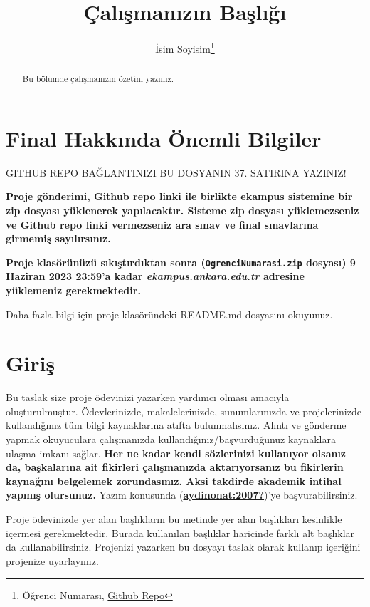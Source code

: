 \documentclass[
  12pt,
]{article}
\title{Çalışmanızın Başlığı}
\author{İsim Soyisim\footnote{Öğrenci Numarası, \href{https://github.com/KULLANICI_ADINIZ/REPO_ADINIZ}{Github Repo}}}
\date{}
\begin{document}
\maketitle
\begin{abstract}
Bu bölümde çalışmanızın özetini yazınız.
\end{abstract}

\hypertarget{final-hakkux131nda-uxf6nemli-bilgiler}{%
\section{Final Hakkında Önemli Bilgiler}\label{final-hakkux131nda-uxf6nemli-bilgiler}}

\colorbox{BurntOrange}{GITHUB REPO BAĞLANTINIZI BU DOSYANIN 37. SATIRINA YAZINIZ!}

\textbf{Proje gönderimi, Github repo linki ile birlikte ekampus sistemine bir zip dosyası yüklenerek yapılacaktır. Sisteme zip dosyası yüklemezseniz ve Github repo linki vermezseniz ara sınav ve final sınavlarına girmemiş sayılırsınız.}

\textbf{Proje klasörünüzü sıkıştırdıktan sonra (\texttt{OgrenciNumarasi.zip} dosyası) 9 Haziran 2023 23:59'a kadar \emph{ekampus.ankara.edu.tr} adresine yüklemeniz gerekmektedir.}

\colorbox{WildStrawberry}{Daha fazla bilgi için proje klasöründeki README.md dosyasını okuyunuz.}

\hypertarget{giriux15f}{%
\section{Giriş}\label{giriux15f}}

Bu taslak size proje ödevinizi yazarken yardımcı olması amacıyla oluşturulmuştur. Ödevlerinizde, makalelerinizde, sunumlarınızda ve projelerinizde kullandığınız tüm bilgi kaynaklarına atıfta bulunmalısınız. Alıntı ve gönderme yapmak okuyuculara çalışmanızda kullandığınız/başvurduğunuz kaynaklara ulaşma imkanı sağlar. \textbf{Her ne kadar kendi sözlerinizi kullanıyor olsanız da, başkalarına ait fikirleri çalışmanızda aktarıyorsanız bu fikirlerin kaynağını belgelemek zorundasınız. Aksi takdirde akademik intihal yapmış olursunuz.} Yazım konusunda (\protect\hyperlink{ref-aydinonat:2007}{\textbf{aydinonat:2007?}})'ye başvurabilirsiniz.

Proje ödevinizde yer alan başlıkların bu metinde yer alan başlıkları kesinlikle içermesi gerekmektedir. Burada kullanılan başlıklar haricinde farklı alt başlıklar da kullanabilirsiniz. Projenizi yazarken bu dosyayı taslak olarak kullanıp içeriğini projenize uyarlayınız.
\end{document}
